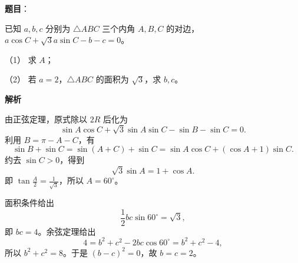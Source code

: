 \begin{answer}

\textbf{题目}：

已知 $a,b,c$ 分别为 $\triangle ABC$ 三个内角 $A,B,C$ 的对边，$a\cos C+\sqrt3a\sin C-b-c=0$。

（1） 求 $A$；

（2） 若 $a=2$，$\triangle ABC$ 的面积为 $\sqrt3$，求 $b,c$。

\textbf{解析}


由正弦定理，原式除以 $2R$ 后化为
\nopagebreak[4]
\[
\sin A\cos C+\sqrt3\sin A\sin C-\sin B-\sin C=0.
\]
利用 $B=\pi-A-C$，有
\nopagebreak[4]
\[
\sin B+\sin C=\sin(A+C)+\sin C
=\sin A\cos C+(\cos A+1)\sin C.
\]
约去 $\sin C>0$，得到
\nopagebreak[4]
\[
\sqrt3\sin A=1+\cos A.
\]
即 $\tan\frac A2=\frac1{\sqrt3}$，所以 $A=60^\circ$。


面积条件给出
\nopagebreak[4]
\[
\frac12bc\sin60^\circ=\sqrt3,
\]
即 $bc=4$。余弦定理给出
\nopagebreak[4]
\[
4=b^2+c^2-2bc\cos60^\circ=b^2+c^2-4,
\]
所以 $b^2+c^2=8$。于是 $(b-c)^2=0$，故 $b=c=2$。



\end{answer}
